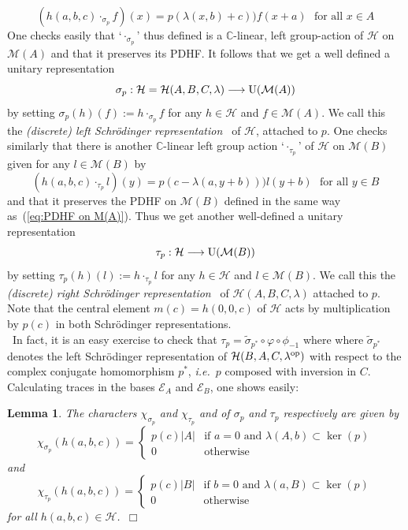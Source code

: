 \documentclass[12pt]{article}
\newtheorem{lemma}{Lemma}[section]
\newcommand{\bbC}{\ensuremath{\mathbb{C}}}\newcommand{\bbCp}{\ensuremath{\mathbb{C}_p}}
\newcommand{\cE}{\ensuremath{\mathcal{E}}}
\newcommand{\cH}{\ensuremath{\mathcal{H}}}
\newcommand{\cM}{\mathcal{M}}
\newcommand{\eitherortw}[4] %
{\left\{                  %
	\begin{array}{ll}         %
		#1& \mbox{#2}\\
		#3& \mbox{#4}
	\end{array}
	\right.}
\newcommand{\ePf}{~$\Box$\vertsp\par}%
\newcommand{\ie}{{\em i.e.}}
\newcommand{\op}{^{\rm op}}%
\renewcommand{\rem}{\refstepcounter{rem}\noindent{\sc Remark \therem}}
\renewcommand{\t}[1]{\tilde{#1}}
\renewcommand{\therem}{\thesection.\arabic{rem}}
\newcommand{\U}{{\rm U}}
\newcommand{\vertsp}{\vspace{1ex}}
\newcommand{\Hei}[4]{\cH({#1},{#2},{#3},{#4})}
\newcommand{\HeiStan}{\Hei{A}{B}{C}{\lambda}}
\newcommand{\rep}{representation\ }
\begin{document}
\begin{equation}\label{eq: defn of Schrod psi-action on functions}
	\left(h(a,b,c)\cdot_{\sigma_p}f\right)(x)= 
	p(\lambda(x,b)+c))f(x+a)\ \ \ \mbox{for all $x\in A$}
\end{equation}
One checks easily that `$\cdot_{\sigma_p}$' thus defined is a $\bbC$-linear, left group-action of  $\cH$ on $\cM(A)$ and that it preserves its PDHF. 
It follows that we get a well defined a unitary representation
$$
\sigma_p:\cH=\HeiStan\longrightarrow \U(\cM(A))
$$ 
by setting $\sigma_p(h)(f):=h\cdot_{\sigma_p} f$ for any $h\in\cH$ and $f\in\cM(A)$. We call this the {\em (discrete) left Schr\"odinger \rep} of $\cH$, attached to $p$. 
One checks similarly that there is another $\bbC$-linear left 
group action `$\cdot_{\tau_p}$' of $\cH$ on $\cM(B)$ given for any $l\in\cM(B)$ by 
\begin{equation}\label{eq: RIGHT Schrod psi-action on functions}
	\left(h(a,b,c)\cdot_{\tau_p}l\right)(y)= 
	p(c-\lambda(a,y+b)))l(y+b)\ \ \ \mbox{for all $y\in B$}
\end{equation}
and that it preserves the PDHF on $\cM(B)$ defined in the same way as~(\ref{eq:PDHF on M(A)}). 
Thus we get another well-defined a unitary representation
$$
\tau_p:\cH\longrightarrow \U(\cM(B))
$$ 
by setting $\tau_p(h)(l):= h\cdot_{\tau_p}l$ for any $h\in\cH$ and $l\in\cM(B)$. We call this the {\em (discrete) right Schr\"odinger \rep} of $\HeiStan$ attached to $p$. 
Note that the central element $m(c)=h(0,0,c)$ of $\cH$ acts by multiplication by $p(c)$ in both Schr\"odinger representations.\bigskip\\ 
\rem\label{rem:linking tau to sigma of HBA gp via varphi}\ In fact, it is an easy exercise to check that $\tau_p=\t \sigma_{p^\ast}\circ\varphi\circ\phi_{-1}$ where where $\t \sigma_{p^\ast}$ denotes the left Schr\"odinger representation of $\Hei{B}{A}{C}{\lambda\op}$ with respect to the complex conjugate homomorphism $p^\ast$, \ie\ $p$ composed with inversion in $C$.\bigskip\\
Calculating traces in the bases $\cE_A$ and $\cE_B$, one shows easily:  
\begin{lemma}\label{lemma:char of rho psi} 
	The characters
	$\chi_{\sigma_p}$ and $\chi_{\tau_p}$ and  of $\sigma_p$ and $\tau_p$ respectively are given by 
	$$
	\chi_{\sigma_p}(h(a,b,c))=
	\eitherortw{p(c)|A|}{if $a=0$ and $\lambda(A,b)\subset\ker(p)$}{0}{otherwise}
	$$
	and
	$$
	\chi_{\tau_p}(h(a,b,c))=
	\eitherortw{p(c)|B|}{if $b=0$ and $\lambda(a,B)\subset\ker(p)$}{0}{otherwise}
	$$
	for all $h(a,b,c)\in\cH$.\ePf
\end{lemma}
\end{document}
